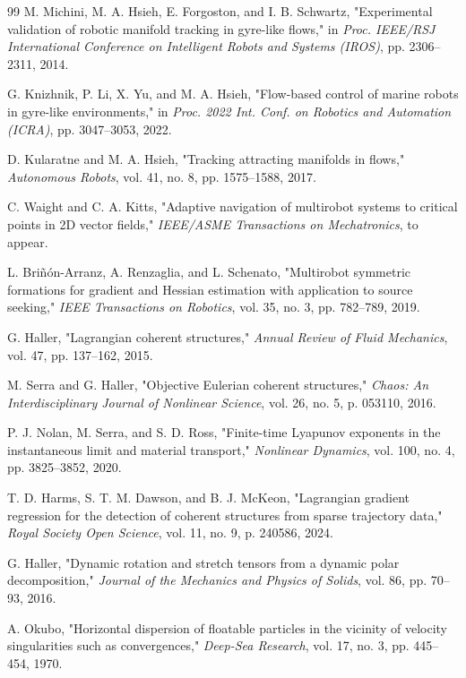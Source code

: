 \documentclass[lettersize,journal]{IEEEtran}
\begin{document}
\begin{thebibliography}{99}
 M. Michini, M. A. Hsieh, E. Forgoston, and I. B. Schwartz,
"Experimental validation of robotic manifold tracking in gyre-like flows,"
in \textit{Proc. IEEE/RSJ International Conference on Intelligent Robots
and Systems (IROS)}, pp. 2306--2311, 2014.

 G. Knizhnik, P. Li, X. Yu, and M. A. Hsieh, "Flow-based control
of marine robots in gyre-like environments," in \textit{Proc. 2022 Int. Conf.
on Robotics and Automation (ICRA)}, pp. 3047--3053, 2022.

 D. Kularatne and M. A. Hsieh, "Tracking attracting manifolds in
flows," \textit{Autonomous Robots}, vol. 41, no. 8, pp. 1575--1588, 2017.

 C. Waight and C. A. Kitts, "Adaptive navigation of multirobot
systems to critical points in 2D vector fields," \textit{IEEE/ASME Transactions
on Mechatronics}, to appear.

 L. Briñón-Arranz, A. Renzaglia, and L. Schenato, "Multirobot
symmetric formations for gradient and Hessian estimation with application to
source seeking," \textit{IEEE Transactions on Robotics}, vol. 35, no. 3,
pp. 782--789, 2019.

 G. Haller, "Lagrangian coherent structures," \textit{Annual
Review of Fluid Mechanics}, vol. 47, pp. 137--162, 2015.

 M. Serra and G. Haller, "Objective Eulerian coherent
structures," \textit{Chaos: An Interdisciplinary Journal of Nonlinear
Science}, vol. 26, no. 5, p. 053110, 2016.

 P. J. Nolan, M. Serra, and S. D. Ross, "Finite-time Lyapunov
exponents in the instantaneous limit and material transport,"
\textit{Nonlinear Dynamics}, vol. 100, no. 4, pp. 3825--3852, 2020.

 T. D. Harms, S. T. M. Dawson, and B. J. McKeon, "Lagrangian
gradient regression for the detection of coherent structures from sparse
trajectory data," \textit{Royal Society Open Science}, vol. 11, no. 9,
p. 240586, 2024.

 G. Haller, "Dynamic rotation and stretch tensors from a
dynamic polar decomposition," \textit{Journal of the Mechanics and Physics
of Solids}, vol. 86, pp. 70--93, 2016.

 A. Okubo, "Horizontal dispersion of floatable particles in the
vicinity of velocity singularities such as convergences," \textit{Deep-Sea
Research}, vol. 17, no. 3, pp. 445--454, 1970.


\end{thebibliography}
\end{document}
